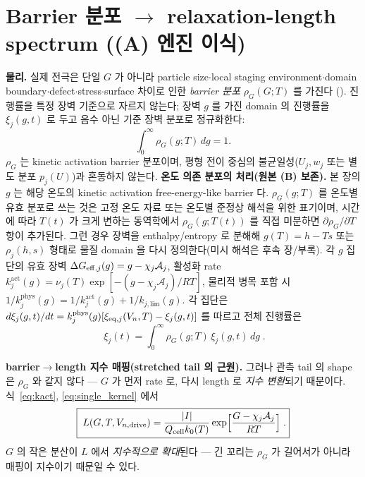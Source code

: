 \section{Barrier 분포 $\to$ relaxation-length spectrum ((A) 엔진 이식)}\label{sec:spectrum}
\textbf{물리.} 실제 전극은 단일 $G$ 가 아니라 particle size$\cdot$local staging environment$\cdot$domain
boundary$\cdot$defect$\cdot$stress$\cdot$surface 차이로 인한 \emph{barrier 분포} $\rho_G(G;T)$ 를 가진다
(). 진행률을 특정 장벽 기준으로 자르지 않는다; 장벽 $g$ 를 가진 domain 의 진행률을 $\xi_j(g,t)$ 로
두고 음수 아닌 기준 장벽 분포로 정규화한다:
\begin{equation}
\int_0^\infty \rho_G(g;T)\,dg=1.
\label{eq:rho_norm}
\end{equation}
$\rho_G$ 는 kinetic activation barrier 분포이며, 평형 전이 중심의 불균일성($U_j,w_j$ 또는 별도 분포
$p_j(U)$)과 혼동하지 않는다.
\textbf{온도 의존 분포의 처리(원본 (B) 보존).} 본 장의 $g$ 는 해당 온도의 kinetic activation
free-energy-like barrier 다. $\rho_G(g;T)$ 를 온도별 유효 분포로 쓰는 것은 고정 온도 자료 또는 온도별
준정상 해석을 위한 표기이며, 시간에 따라 $T(t)$ 가 크게 변하는 동역학에서 $\rho_G(g;T(t))$ 를 직접 미분하면
$\partial\rho_G/\partial T$ 항이 추가된다. 그런 경우 장벽을 enthalpy/entropy 로 분해해 $g(T)=h-Ts$ 또는
$\rho_j(h,s)$ 형태로 물질 domain 을 다시 정의한다(미시 해석은 후속 장/부록).
각 $g$ 집단의 유효 장벽 $\Delta G_{\mathrm{eff},j}(g)=g-\chi_j\mathcal A_j$, 활성화
rate $k_j^\mathrm{act}(g)=\nu_j(T)\exp[-(g-\chi_j\mathcal A_j)/RT]$, 물리적 병목 포함 시
$1/k_j^\mathrm{phys}(g)=1/k_j^\mathrm{act}(g)+1/k_{j,\mathrm{lim}}(g)$. 각 집단은
$d\xi_j(g,t)/dt=k_j^\mathrm{phys}(g)[\xi_{\mathrm{eq},j}(V_n,T)-\xi_j(g,t)]$ 를 따르고 전체 진행률은
\begin{equation}
\boxed{\;\xi_j(t)=\int_0^\infty \rho_G(g;T)\,\xi_j(g,t)\,dg\;.}
\label{eq:xi_dist}
\end{equation}

\textbf{barrier$\to$length 지수 매핑(stretched tail 의 근원).} 그러나 관측 tail 의 shape 은 $\rho_G$ 와
같지 않다 — $G$ 가 먼저 rate 로, 다시 length 로 \emph{지수 변환}되기 때문이다. 식~\eqref{eq:kact},
\eqref{eq:single_kernel} 에서
\begin{equation}
\boxed{\;L(G,T,V_{n,\mathrm{drive}})=\frac{|I|}{Q_{\mathrm{cell}} k_0(T)}\exp\!\Big[\frac{G-\chi_j\mathcal A_j}{RT}\Big]\;.}
\label{eq:L_of_G}
\end{equation}
$G$ 의 작은 분산이 $L$ 에서 \emph{지수적으로 확대}된다 — 긴 꼬리는 $\rho_G$ 가 길어서가 아니라 매핑이
지수이기 때문일 수 있다.

